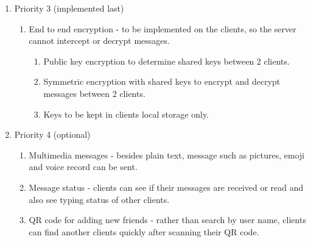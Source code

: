 \begin{enumerate}
\begin{enumerate}[label*=\arabic*.]
\begin{enumerate}[label*=\arabic*.]
\end{enumerate}
\end{enumerate}
\item Priority 3 (implemented last)
\begin{enumerate}[label*=\arabic*.]

\item End to end encryption - to be implemented on the clients, so the server cannot intercept or decrypt messages.
\begin{enumerate}[label*=\arabic*.]
\item Public key encryption to determine shared keys between 2 clients.
\item Symmetric encryption with shared keys to encrypt and decrypt messages between 2 clients.
\item Keys to be kept in clients local storage only.
\end{enumerate}
\end{enumerate}
\item Priority 4 (optional)
\begin{enumerate}[label*=\arabic*.]
\item Multimedia messages - besides plain text, message such as pictures, emoji and voice record can be sent.
\item Message status - clients can see if their messages are received or read and also see  typing status of other clients.
\item QR code for adding new friends - rather than search by user name, clients can find another clients quickly after scanning their QR code.


\end{enumerate}
\end{enumerate}
